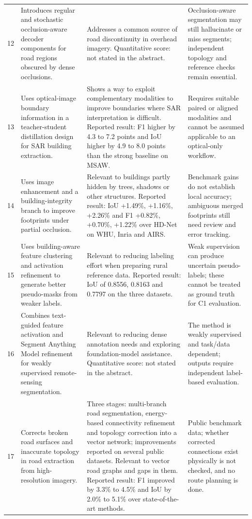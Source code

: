 \begin{landscape}
\begin{longtable}{@{}L{0.6cm}L{7.5cm}L{8.0cm}L{7.5cm}@{}}
12 & Introduces regular and stochastic occlusion-aware decoder components for road regions obscured by dense occlusions. & Addresses a common source of road discontinuity in overhead imagery. Quantitative score: not stated in the abstract. & Occlusion-aware segmentation may still hallucinate or miss segments; independent topology and reference checks remain essential.  \\
13 & Uses optical-image boundary information in a teacher-student distillation design for SAR building extraction. & Shows a way to exploit complementary modalities to improve boundaries where SAR interpretation is difficult. Reported result: F1 higher by 4.3 to 7.2 points and IoU higher by 4.9 to 8.0 points than the strong baseline on MSAW. & Requires suitable paired or aligned modalities and cannot be assumed applicable to an optical-only workflow.  \\
14 & Uses image enhancement and a building-integrity branch to improve footprints under partial occlusion. & Relevant to buildings partly hidden by trees, shadows or other structures. Reported result: IoU +1.49\%, +1.16\%, +2.26\% and F1 +0.82\%, +0.70\%, +1.22\% over HD-Net on WHU, Inria and AIRS. & Benchmark gains do not establish local accuracy; ambiguous merged footprints still need review and error tracking.  \\
15 & Uses building-aware feature clustering and activation refinement to generate better pseudo-masks from weaker labels. & Relevant to reducing labeling effort when preparing rural reference data. Reported result: IoU of 0.8556, 0.8163 and 0.7797 on the three datasets. & Weak supervision can produce uncertain pseudo-labels; these cannot be treated as ground truth for C1 evaluation.  \\
16 & Combines text-guided feature activation and Segment Anything Model refinement for weakly supervised remote-sensing segmentation. & Relevant to reducing dense annotation needs and exploring foundation-model assistance. Quantitative score: not stated in the abstract. & The method is weakly supervised and task/data dependent; outputs require independent label-based evaluation.  \\
17 & Corrects broken road surfaces and inaccurate topology in road extraction from high-resolution imagery. & Three stages: multi-branch road segmentation, energy-based connectivity refinement and topology correction into a vector network; improvements reported on several public datasets. Relevant to vector road graphs and gaps in them. Reported result: F1 improved by 3.3\% to 4.5\% and IoU by 2.0\% to 5.1\% over state-of-the-art methods. & Public benchmark data; whether corrected connections exist physically is not checked, and no route planning is done.  \\

\end{longtable}
\end{landscape}
